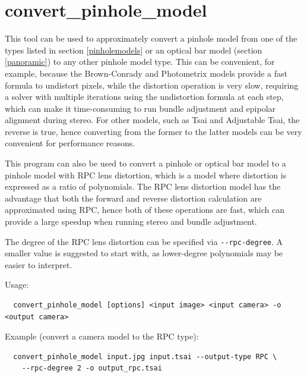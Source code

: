 \section{convert\_pinhole\_model}
\label{convertpinholemodel}

This tool can be used to approximately convert a pinhole model from one
of the types listed in section \ref{pinholemodels} or an optical bar
model (section \ref{panoramic}) to any other pinhole model type. This can be convenient, for
example, because the Brown-Conrady and Photometrix models provide a fast
formula to undistort pixels, while the distortion operation is very
slow, requiring a solver with multiple iterations using the undistortion
formula at each step, which can make it time-consuming to run bundle
adjustment and epipolar alignment during stereo.  For other models, such
as Tsai and Adjustable Tsai, the reverse is true, hence converting from
the former to the latter models can be very convenient for performance
reasons.

This program can also be used to convert a pinhole or optical bar model
to a pinhole model with RPC lens distortion, which is a model where
distortion is expressed as a ratio of polynomials. The
RPC lens distortion model has the advantage that both the forward and
reverse distortion calculation are approximated using RPC, hence both of
these operations are fast, which can provide a large speedup when
running stereo and bundle adjustment.

The degree of the RPC lens distortion can be specified via
\texttt{-\/-rpc-degree}. A smaller value is suggested to start with, as
lower-degree polynomials may be easier to interpret.

Usage:
\begin{verbatim}
  convert_pinhole_model [options] <input image> <input camera> -o <output camera>
\end{verbatim}

Example (convert a camera model to the RPC type):

\begin{verbatim}
  convert_pinhole_model input.jpg input.tsai --output-type RPC \
    --rpc-degree 2 -o output_rpc.tsai
\end{verbatim}

